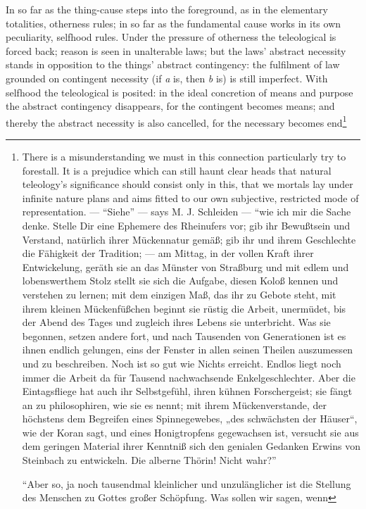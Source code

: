 \documentclass[12pt,a4paper]{book}
\begin{document}
In so far as the thing-cause steps into the foreground, as in the elementary
totalities, otherness rules; in so far as the fundamental cause works in its own
peculiarity, selfhood rules. Under the pressure of otherness the teleological is
forced back; reason is seen in unalterable laws; but the laws' abstract necessity
stands in opposition to the things' abstract contingency: the fulfilment of law
grounded on contingent necessity (if \textit{a} is, then \textit{b} is) is still
imperfect. With selfhood the teleological is posited: in the ideal concretion of
means and purpose the abstract contingency disappears, for the contingent becomes
means; and thereby the abstract necessity is also cancelled, for the necessary
becomes end\footnote{There is a misunderstanding we must in this connection
particularly try to forestall. It is a prejudice which can still haunt clear
heads that natural teleology's significance should consist only in this, that we
mortals lay under infinite nature plans and aims fitted to our own subjective,
restricted mode of representation. --- ``Siehe'' --- says M. J. Schleiden ---
``wie ich mir die Sache denke. Stelle Dir eine Ephemere des Rheinufers vor; gib
ihr Bewußtsein und Verstand, natürlich ihrer Mückennatur gemäß; gib ihr und
ihrem Geschlechte die Fähigkeit der Tradition; --- am Mittag, in der vollen
Kraft ihrer Entwickelung, geräth sie an das Münster von Straßburg und mit edlem
und lobenswerthem Stolz stellt sie sich die Aufgabe, diesen Koloß kennen und
verstehen zu lernen; mit dem einzigen Maß, das ihr zu Gebote steht, mit ihrem
kleinen Mückenfüßchen beginnt sie rüstig die Arbeit, unermüdet, bis der Abend
des Tages und zugleich ihres Lebens sie unterbricht. Was sie begonnen, setzen
andere fort, und nach Tausenden von Generationen ist es ihnen endlich gelungen,
eins der Fenster in allen seinen Theilen auszumessen und zu beschreiben. Noch
ist so gut wie Nichts erreicht. Endlos liegt noch immer die Arbeit da für
Tausend nachwachsende Enkelgeschlechter. Aber die Eintagsfliege hat auch ihr
Selbstgefühl, ihren kühnen Forschergeist; sie fängt an zu philosophiren, wie
sie es nennt; mit ihrem Mückenverstande, der höchstens dem Begreifen eines
Spinnegewebes, „des schwächsten der Häuser“, wie der Koran sagt, und eines
Honigtropfens gegewachsen ist, versucht sie aus dem geringen Material ihrer
Kenntniß sich den genialen Gedanken Erwins von Steinbach zu entwickeln. Die
alberne Thörin! Nicht wahr?''
\par ``Aber so, ja noch tausendmal kleinlicher und unzulänglicher ist die
Stellung des Menschen zu Gottes großer Schöpfung. Was sollen wir sagen, wenn
}
\end{document}
